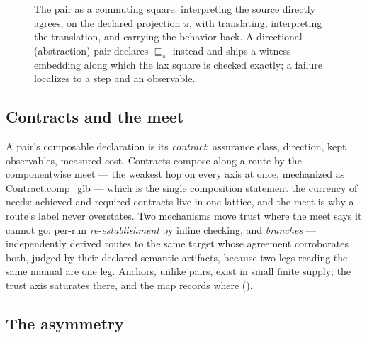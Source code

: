 \begin{figure}
\centering
{}
\caption{The pair as a commuting square: interpreting the source
directly agrees, on the declared projection $\pi$, with translating,
interpreting the translation, and carrying the behavior back. A
directional (abstraction) pair declares $\sqsubseteq_\pi$ instead
and ships a witness embedding along which the lax square is checked
exactly; a failure localizes to a step and an observable.}
\label{fig:square}
\end{figure}

\subsection{Contracts and the meet}
\label{sec:inst-contracts}

A pair's composable declaration is its \emph{contract}: assurance
class, direction, kept observables, measured cost. Contracts compose
along a route by the componentwise meet — the weakest hop on every
axis at once, mechanized as \textsf{Contract.comp\_glb} — which is
the single composition statement the currency of 
needs: achieved and required contracts live in one lattice, and the
meet is why a route's label never overstates. Two mechanisms move
trust where the meet says it cannot go: per-run \emph{re-establishment}
by inline checking, and \emph{branches} — independently derived routes
to the same target whose agreement corroborates both, judged by their
declared semantic artifacts, because two legs reading the same manual
are one leg. Anchors, unlike pairs, exist in small finite supply; the
trust axis saturates there, and the map records where
().

\subsection{The asymmetry}
\label{sec:inst-asym}


